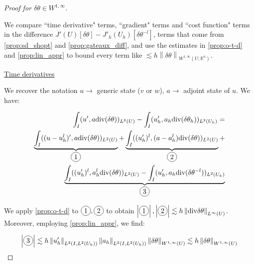 \documentclass[english,a4paper,10pt,oneside]{scrbook}	%
\theoremstyle{break}
\newenvironment{mproof}[1][\proofname]{%
  \begin{proof}[#1]$ $\par\nobreak\ignorespaces
}{%
  \end{proof}
}
\renewcommand*{\proofname}{Proof}
\theoremstyle{remark}
\newcommand{\mR}{\mathbb{R}}
\newcommand{\ds}{\displaystyle}
\newcommand{\norm}[1]{\left\lVert#1\right\rVert}
\newcommand{\te}{\theta}
\newcommand{\dive}{\text{div}}
\newcommand*\circled[1]{\tikz[baseline=(char.base)]{
            \node[shape=circle,draw,inner sep=2pt] (char) {#1};}}
\begin{document}
\begin{mproof}[Proof for $\delta \te \in W^{1,\infty}$]
We compare ``time derivative" terms, ``gradient" terms and ``cost function" terms in the difference $\ds J'(U)[\delta \te] - J'_h(U_h)[\delta \te^{-l}]$, terms that come from \cref{prop:sd_shopt} and \cref{prop:gateaux_diff}, and use the estimates in \cref{prop:o-t-d} and \cref{prop:lin_appr} to bound every term like $\lesssim h \norm{\delta \te}_{W^{1,\infty}(U;\mR^n)}$. 


\underline{Time derivatives}

We recover the notation $u\rightarrow$ generic state ($v$ or $w$), $a\rightarrow$ adjoint state of $u$.
We have:

\begin{align*}
	\int_I(u',a\dive(\delta \te))_{L^2(U)}-\int_I (u_h',a_h\dive(\delta \te_h))_{L^2(U_h)}=\\
	\underbrace{\int_I((u-u_h^l)',a\dive(\delta \te))_{L^2(U)}}_{\circled{1}}+
	\underbrace{\int_I((u_h')^l, (a-a_h^l)\dive(\delta \te))_{L^2(U)}}_{\circled{2}}+\\
	\underbrace{\int_I((u_h')^l, a_h^l\dive(\delta \te))_{L^2(U)}-\int_I (u_h',a_h\dive(\delta \te^{-l}))_{L^2(U_h)}}_{\circled{3}}
\end{align*}



We apply  \cref{prop:o-t-d} to $\circled{1}, \circled{2}$ to obtain $\ds  \left | \circled{1} \right |,  \left | \circled{2} \right | \lesssim h\norm{\dive{\delta \theta}}_{L^\infty(U)}$. Moreover, employing \cref{prop:lin_appr}, we find:

\begin{align*}
	\left | \circled{3} \right |\lesssim  h \norm{u_h'}_{L^2(I,L^2(U_h))}\norm{a_h}_{L^2(I,L^2(U_h))}\norm{\delta \te}_{W^{1,\infty}(U)} \lesssim  h \norm{\delta \te}_{W^{1,\infty}(U)}
\end{align*}


\end{mproof}
\end{document}
